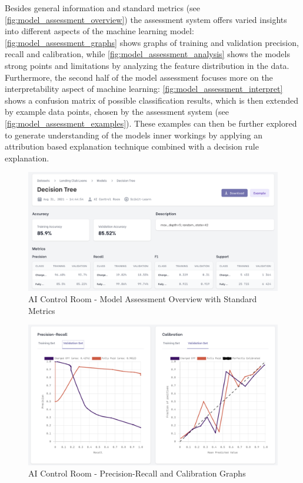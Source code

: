 \documentclass[11pt,a4paper,english]{scrreprt}
\begin{document}
Besides general information and standard metrics (see \autoref{fig:model_assessment_overview}) the assessment system offers varied insights into different aspects of the machine learning model: \autoref{fig:model_assessment_graphs} shows graphs of training and validation precision, recall and calibration, while \autoref{fig:model_assessment_analysis} shows the models strong points and limitations by analyzing the feature distribution in the data. Furthermore, the second half of the model assessment focuses more on the interpretability aspect of machine learning: \autoref{fig:model_assessment_interpret} shows a confusion matrix of possible classification results, which is then extended by example data points, chosen by the assessment system (see \autoref{fig:model_assessment_examples}). These examples can then be further explored to generate understanding of the models inner workings by applying an attribution based explanation technique combined with a decision rule explanation.
\begin{figure}[htbp]
    \centering
    \includegraphics[width=\textwidth]{img/screenshots/model_assessment_overview.png}
    \caption{AI Control Room - Model Assessment Overview with Standard Metrics}
    \label{fig:model_assessment_overview}
\end{figure}
\begin{figure}[htbp]
    \centering
    \includegraphics[width=\textwidth]{img/screenshots/model_assessment_graphs.png}
    \caption{AI Control Room - Precision-Recall and Calibration Graphs}
    \label{fig:model_assessment_graphs}
\end{figure}
\end{document}
